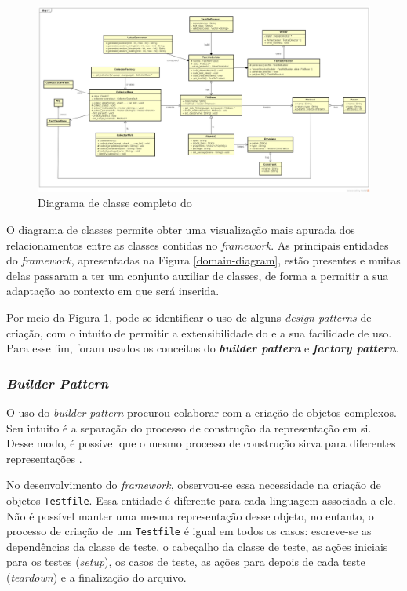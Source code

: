 \begin{landscape}
\begin{figure}[h]
  \centering
    \includegraphics[width=1.5\textwidth, height=\textheight]{figuras/class-diagram.png}
    \caption{Diagrama de classe completo do \scarefault}
    \label{class-diagram}
\end{figure}
\FloatBarrier
\end{landscape}

O diagrama de classes permite obter uma visualização mais apurada dos
relacionamentos entre as classes contidas no \textit{framework}. As principais
entidades do \textit{framework}, apresentadas na Figura \ref{domain-diagram},
estão presentes e muitas delas passaram a ter um conjunto auxiliar de classes,
de forma a permitir a sua adaptação ao contexto em que será inserida.

Por meio da Figura \ref{class-diagram}, pode-se identificar o uso de alguns
\textit{design patterns} de criação, com o intuito de permitir a
extensibilidade do \framework e a sua facilidade de uso. Para esse fim,
foram usados os conceitos do \textbf{\textit{builder pattern}} e
\textbf{\textit{factory pattern}}.

\subsubsection{\textit{Builder Pattern}}
O uso do \textit{builder pattern} procurou colaborar com a criação de objetos complexos. Seu intuito é a separação do processo
de construção da representação em si. Desse modo, é possível que o
mesmo processo de construção sirva para diferentes representações
\cite{gammaEtAl1994}.

No desenvolvimento do \textit{framework}, observou-se essa necessidade na
criação de objetos \lstinline|Testfile|. Essa entidade é diferente para
cada linguagem associada a ele. Não é possível manter uma mesma
representação desse objeto, no entanto, o processo de criação de um
\lstinline|Testfile| é igual em todos os casos: escreve-se as
dependências da classe de teste, o cabeçalho da classe de teste,
as ações iniciais para os testes (\textit{setup}),
os casos de teste, as ações para depois de cada teste
(\textit{teardown}) e a finalização do arquivo.

